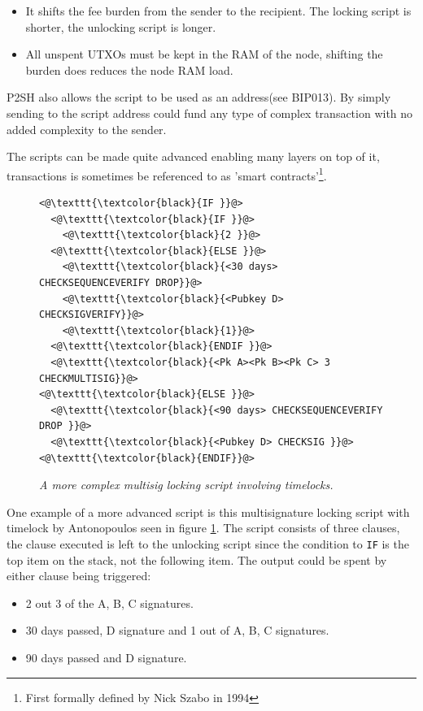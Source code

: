\begin{itemize}

	\item It shifts the fee burden from the sender to the recipient. The locking script is shorter, the unlocking script is longer.
	
	\item All unspent UTXOs must be kept in the RAM of the node, shifting the burden does reduces the node RAM load. 
	
\end{itemize}

P2SH also allows the script to be used as an address(see BIP013\cite{bip:0013:p2shaddr}). By simply sending to the script address could fund any type of complex transaction with no added complexity to the sender.

The scripts can be made quite advanced enabling many layers on top of it, transactions is sometimes be referenced to as 'smart contracts'\footnote{First formally defined by Nick Szabo in 1994\cite{szabo:smart:contracts}}.

\begin{figure}[hbt!]
	
	\begin{lstlisting}	
<@\texttt{\textcolor{black}{IF }}@>
  <@\texttt{\textcolor{black}{IF }}@>
    <@\texttt{\textcolor{black}{2 }}@>
  <@\texttt{\textcolor{black}{ELSE }}@>
    <@\texttt{\textcolor{black}{<30 days> CHECKSEQUENCEVERIFY DROP}}@>
    <@\texttt{\textcolor{black}{<Pubkey D> CHECKSIGVERIFY}}@>
    <@\texttt{\textcolor{black}{1}}@>
  <@\texttt{\textcolor{black}{ENDIF }}@>
  <@\texttt{\textcolor{black}{<Pk A><Pk B><Pk C> 3 CHECKMULTISIG}}@>
<@\texttt{\textcolor{black}{ELSE }}@>
  <@\texttt{\textcolor{black}{<90 days> CHECKSEQUENCEVERIFY DROP }}@>
  <@\texttt{\textcolor{black}{<Pubkey D> CHECKSIG }}@>
<@\texttt{\textcolor{black}{ENDIF}}@>

	\end{lstlisting}
	
	\caption{\textit{ A more complex multisig locking script involving timelocks.
	}}
	\label{fig:aantop:multi}
\end{figure}

One example of a more advanced script is this multisignature locking script with timelock by Antonopoulos seen in figure \ref{fig:aantop:multi}\cite{antonopoulos:bitcoin:scripting}. The script consists of three clauses, the clause executed is left to the unlocking script since the condition to \texttt{IF} is the top item on the stack, not the following item. The output could be spent by either clause being triggered:
\begin{itemize}
	\item 2 out 3 of the A, B, C signatures.
	\item 30 days passed, D signature and 1 out of A, B, C signatures.
	\item 90 days passed and D signature.
\end{itemize} 

